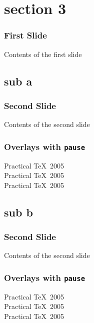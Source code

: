 \section{section 3}

\begin{frame}
\frametitle{First Slide}
Contents of the first slide
\end{frame}

\subsection{sub a}
\begin{frame}
\frametitle{Second Slide}
Contents of the second slide
\end{frame}

\begin{frame}
\frametitle{Overlays with {\tt pause}}
Practical \TeX\ 2005\\ \pause
Practical \TeX\ 2005\\ \pause
Practical \TeX\ 2005
\end{frame}

\subsection{sub b}
\begin{frame}
\frametitle{Second Slide}
Contents of the second slide
\end{frame}

\begin{frame}
\frametitle{Overlays with {\tt pause}}
Practical \TeX\ 2005\\ \pause
Practical \TeX\ 2005\\ \pause
Practical \TeX\ 2005
\end{frame}

\ThankYouFrame

